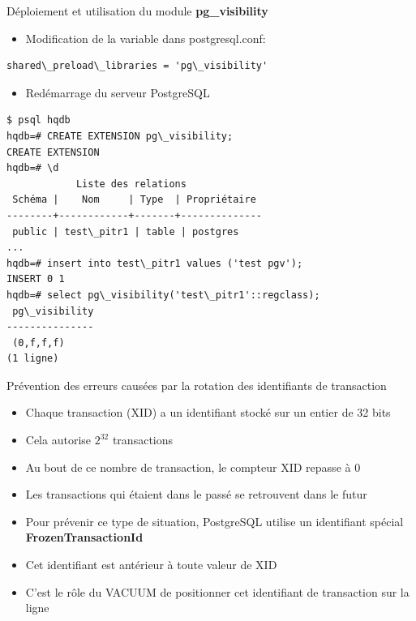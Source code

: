\begin{frame}[fragile]{Déploiement et utilisation du module \textbf{pg\_visibility}}

\begin{itemize}
   \item Modification de la variable dans postgresql.conf:
\end{itemize}

\begin{tiny}
\begin{Verbatim}[commandchars=\&\{\}]
shared\_preload\_libraries = 'pg\_visibility'
\end{Verbatim}
\end{tiny}

\begin{itemize}
   \item Redémarrage du serveur PostgreSQL
\end{itemize}

\begin{tiny}
\begin{Verbatim}[commandchars=\&\{\},fontsize=\tiny]
$ psql hqdb
hqdb=# CREATE EXTENSION pg\_visibility;
CREATE EXTENSION
hqdb=# \d
            Liste des relations
 Schéma |    Nom     | Type  | Propriétaire
--------+------------+-------+--------------
 public | test\_pitr1 | table | postgres
...
hqdb=# insert into test\_pitr1 values ('test pgv');
INSERT 0 1                                           
hqdb=# select pg\_visibility('test\_pitr1'::regclass);
 pg\_visibility                                                 
---------------                     
 (0,f,f,f)                                      
(1 ligne)     
\end{Verbatim}
\end{tiny}

\end{frame}


\begin{frame}{Prévention des erreurs causées par la rotation des identifiants de transaction}

\begin{itemize}
   \item Chaque transaction (XID) a un identifiant stocké sur un entier de 32 bits
   \item Cela autorise $2^{32}$ transactions
   \item Au bout de ce nombre de transaction, le compteur XID repasse à 0
   \item Les transactions qui étaient dans le passé se retrouvent dans le futur
   \item Pour prévenir ce type de situation, PostgreSQL utilise un identifiant spécial \textbf{FrozenTransactionId}
   \item Cet identifiant est antérieur à toute valeur de XID
   \item C'est le rôle du VACUUM de positionner cet identifiant de transaction sur la ligne
\end{itemize}

\end{frame}

